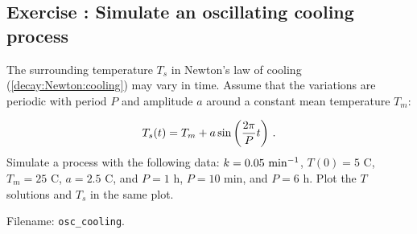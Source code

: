 \documentclass[%
oneside,                 %
final,                   %
10pt]{article}
\newenvironment{doconceexercise}{}{}
\newcounter{doconceexercisecounter}
\begin{document}
\begin{doconceexercise}

\subsection*{Exercise \thedoconceexercisecounter: Simulate an oscillating cooling process}

\label{decay:app:exer:cooling:osc}

The surrounding temperature $T_s$ in Newton's law of cooling
(\ref{decay:Newton:cooling}) may vary in time. Assume that the
variations are periodic with period $P$ and amplitude $a$ around
a constant mean temperature $T_m$:

\begin{equation}
T_s(t) = T_m + a\sin\left(\frac{2\pi}{P}t\right)
\tp
\end{equation}
Simulate a process with the following data: $k=0.05 \hbox{ min}^{-1}$,
$T(0)=5$ C, $T_m=25$ C, $a=2.5$ C, and $P=1$ h, $P=10$ min, and $P=6$ h.
Plot the $T$ solutions and $T_s$ in the same plot.


\noindent Filename: \Verb!osc_cooling!.

\end{doconceexercise}
\end{document}
